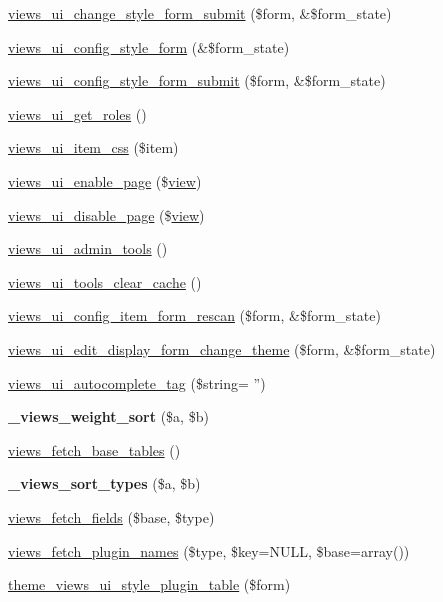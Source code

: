 \begin{CompactItemize}
\item 
\hyperlink{admin_8inc_f49405357d3cc5d22218ec2831c5dd71}{views\_\-ui\_\-change\_\-style\_\-form\_\-submit} (\$form, \&\$form\_\-state)
\item 
\hyperlink{admin_8inc_9cc05ea6bbc6009482ee71d374c4538e}{views\_\-ui\_\-config\_\-style\_\-form} (\&\$form\_\-state)
\item 
\hyperlink{admin_8inc_421a319ebb088e20841e643f67ab1cfe}{views\_\-ui\_\-config\_\-style\_\-form\_\-submit} (\$form, \&\$form\_\-state)
\item 
\hyperlink{admin_8inc_6c6227b21a8ca8e33eabfe00598410cd}{views\_\-ui\_\-get\_\-roles} ()
\item 
\hyperlink{admin_8inc_f6b6dd299deaebad2b2bb09dc78afab3}{views\_\-ui\_\-item\_\-css} (\$item)
\item 
\hyperlink{admin_8inc_82465b0f9577f7992268365fc49dee3d}{views\_\-ui\_\-enable\_\-page} (\$\hyperlink{classview}{view})
\item 
\hyperlink{admin_8inc_46be1cf8820f694e4d4fd2558167b9bb}{views\_\-ui\_\-disable\_\-page} (\$\hyperlink{classview}{view})
\item 
\hyperlink{admin_8inc_8d86dbe400c0ad869694a85f767be3d6}{views\_\-ui\_\-admin\_\-tools} ()
\item 
\hyperlink{admin_8inc_20d738f2a5405c5fbbdbd82954bbf050}{views\_\-ui\_\-tools\_\-clear\_\-cache} ()
\item 
\hyperlink{admin_8inc_2f6df8066d61dc4f84b6bdbfffc70c1c}{views\_\-ui\_\-config\_\-item\_\-form\_\-rescan} (\$form, \&\$form\_\-state)
\item 
\hyperlink{admin_8inc_645b4cf556061727a6d09a0d64770b30}{views\_\-ui\_\-edit\_\-display\_\-form\_\-change\_\-theme} (\$form, \&\$form\_\-state)
\item 
\hyperlink{admin_8inc_1a3a91dbf973532f39cee36c1d99c87b}{views\_\-ui\_\-autocomplete\_\-tag} (\$string= '')
\item 
\hypertarget{admin_8inc_ca9b3ff2e8b27bbde5bfe852a06f8ac6}{
\textbf{\_\-views\_\-weight\_\-sort} (\$a, \$b)}
\label{admin_8inc_ca9b3ff2e8b27bbde5bfe852a06f8ac6}

\item 
\hyperlink{admin_8inc_36ed4b1513b45a8a358d2cb3fb287d06}{views\_\-fetch\_\-base\_\-tables} ()
\item 
\hypertarget{admin_8inc_33087fe4da0c42948a6c0973585ca1cd}{
\textbf{\_\-views\_\-sort\_\-types} (\$a, \$b)}
\label{admin_8inc_33087fe4da0c42948a6c0973585ca1cd}

\item 
\hyperlink{admin_8inc_cfe593e87bda99fc3263579ba22cb9a8}{views\_\-fetch\_\-fields} (\$base, \$type)
\item 
\hyperlink{admin_8inc_e7963b102753500f8de139bf60d59ca5}{views\_\-fetch\_\-plugin\_\-names} (\$type, \$key=NULL, \$base=array())
\item 
\hyperlink{admin_8inc_ca470c026194aeade2469d96c661fb8e}{theme\_\-views\_\-ui\_\-style\_\-plugin\_\-table} (\$form)
\end{CompactItemize}


